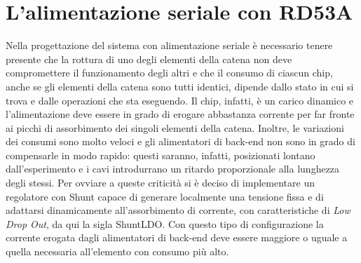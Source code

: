 \section{L'alimentazione seriale con RD53A}

Nella progettazione del sistema con alimentazione seriale è necessario tenere presente che la rottura di uno degli elementi della catena non deve compromettere il funzionamento degli altri e che il consumo di ciascun chip, anche se gli elementi della catena sono tutti identici, dipende dallo stato in cui si trova e dalle operazioni che sta eseguendo. 
Il chip, infatti, è un carico dinamico e l'alimentazione deve essere in grado di erogare abbastanza corrente per far fronte ai picchi di assorbimento dei singoli elementi della catena.
Inoltre, le variazioni dei consumi sono molto veloci e gli alimentatori di back-end non sono in grado di compensarle in modo rapido: questi saranno, infatti, posizionati lontano dall'esperimento e i cavi introdurrano un ritardo proporzionale alla lunghezza degli stessi.
Per ovviare a queste criticità si è deciso di implementare un regolatore con Shunt capace di generare localmente una tensione fissa e di adattarsi dinamicamente all'assorbimento di corrente, con caratteristiche di \textit{Low Drop Out}, da qui la sigla ShuntLDO.
Con questo tipo di configurazione la corrente erogata dagli alimentatori di back-end deve essere maggiore o uguale a quella necessaria all'elemento con consumo più alto.

